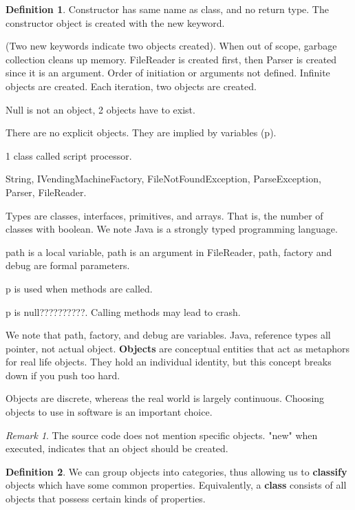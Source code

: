 \documentclass[11pt]{article}
\theoremstyle{plain} %
\theoremstyle{definition}
\newtheorem*{definition}{Definition} %
\theoremstyle{example}
\theoremstyle{remark}
\newtheorem*{remark}{Remark}
\begin{document}
\begin{definition}

Constructor has same name as class, and no return type. The constructor object is created with the new keyword. 

(Two new keywords indicate two objects created).
When out of scope, garbage collection cleans up memory. FileReader is created first, then Parser is created since it is an argument. Order of initiation or arguments not defined. Infinite objects are created. Each iteration, two objects are created. 

Null is not an object, 2 objects have to exist.

There are no explicit objects. They are implied by variables (p). 

1 class called script processor. 

String, IVendingMachineFactory, FileNotFoundException, ParseException, Parser, FileReader.

Types are classes, interfaces, primitives, and arrays. That is, the number of classes with boolean.
We note Java is a strongly typed programming language.

path is a local variable, path is an argument in FileReader, path, factory and debug are formal parameters.

p is used when methods are called.

p is null??????????. Calling methods may lead to crash. 

We note that path, factory, and debug are variables. Java, reference types all pointer, not actual object. 
\textbf{Objects} are conceptual entities that act as metaphors for real life objects. They hold an individual identity, but this concept breaks down if you push too hard. \end{definition}

Objects are discrete, whereas the real world is largely continuous. Choosing objects to use in software is an important choice. 

\begin{remark}
The source code does not mention  specific objects. "new" when executed, indicates that an object should be created. 
\end{remark}

\begin{definition}
We can group objects into categories, thus allowing us to \textbf{classify} objects which have some common properties. Equivalently, a \textbf{class} consists of all objects that possess certain kinds of properties. 
\end{definition}
\end{document}
